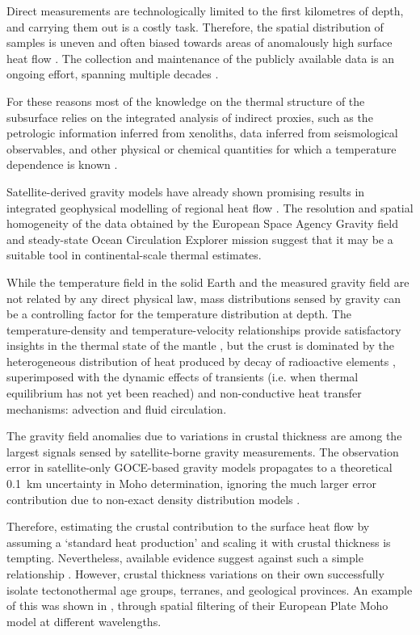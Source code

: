 Direct measurements are technologically limited to the first kilometres of depth, and carrying them out is a costly task.
Therefore, the spatial distribution of samples is uneven and often biased towards areas of anomalously high surface heat flow \parencite{Mareschal2013}.
The collection and maintenance of the publicly available data is an ongoing effort, spanning multiple decades \parencite{Lee1965}.

For these reasons most of the knowledge on the thermal structure of the subsurface relies on the integrated analysis of indirect proxies, such as the petrologic information inferred from xenoliths, data inferred from seismological observables, and other physical or chemical quantities for which a temperature dependence is known \parencites{fischer2010lab}{Vila2010}{Afonso2013multiobsI}.

Satellite-derived gravity models have already shown promising results in integrated geophysical modelling of regional heat flow \parencite{Bouman2015}.
The resolution and spatial homogeneity of the data obtained by the European Space Agency Gravity field and steady-state Ocean Circulation Explorer mission \parencites[GOCE, ][]{Floberghagen2011_goce}{vanderMeijde2015} suggest that it may be a suitable tool in continental-scale thermal estimates.

While the temperature field in the solid Earth and the measured gravity field are not related by any direct physical law, mass distributions sensed by gravity can be a controlling factor for the temperature distribution at depth.
The temperature-density and temperature-velocity relationships provide satisfactory insights in the thermal state of the mantle \parencites{Priestley2006}{Cammarano2011}, but the crust is dominated by the heterogeneous distribution of heat produced by decay of radioactive elements \parencite{Jaupart2016}, superimposed with the dynamic effects of transients (i.e. when thermal equilibrium has not yet been reached) and non-conductive heat transfer mechanisms: advection and fluid circulation.

The gravity field anomalies due to variations in crustal thickness are among the largest signals sensed by satellite-borne gravity measurements.
The observation error in satellite-only GOCE-based gravity models propagates to a theoretical 0.1~\si{\kilo \metre} uncertainty in Moho determination, ignoring the much larger error contribution due to non-exact density distribution models \parencite{braitenberg2011goce}.

Therefore, estimating the crustal contribution to the surface heat flow by assuming a `standard heat production' and scaling it with crustal thickness is tempting.
Nevertheless, available evidence suggest against such a simple relationship \parencite{Mareschal2013}.
However, crustal thickness variations on their own successfully isolate tectonothermal age groups, terranes, and geological provinces.
An example of this was shown in \textcite{Grad2009}, through spatial filtering of their European Plate Moho model at different wavelengths.

